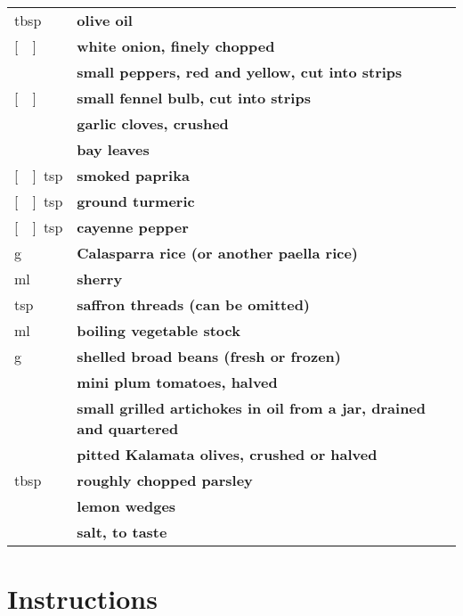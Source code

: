 \documentclass[main.tex]{subfiles}
\begin{document}
\vspace*{-\baselineskip}
\begin{table}[ht]
	\begin{tabularx}{\textwidth}{>{\hsize=0.333\hsize}X>{\bf\hsize=1\hsize}X}
	\unit[3]{tbsp} & olive oil\\
	\unit[\nicefrac{1}{2}]{} & white onion, finely chopped \\
	\unit[2]{} & small peppers, \unit[1]{} red and \unit[1]{} yellow, cut into strips\\
	\unit[\nicefrac{1}{2}]{} & small fennel bulb, cut into strips\\
	\unit[2]{} & garlic cloves, crushed\\
	\unit[2]{} & bay leaves \\
	\unit[\nicefrac{1}{4}]{tsp} & smoked paprika \\
	\unit[\nicefrac{1}{2}]{tsp} & ground turmeric \\
	\unit[\nicefrac{1}{4}]{tsp} & cayenne pepper \\
	\unit[150]{g} & Calasparra rice (or another paella rice) \\
	\unit[100]{ml} & sherry \\
	\unit[1]{tsp} & saffron threads (can be omitted) \\
	\unit[450]{ml} & boiling vegetable stock \\
	\unit[200]{g} & shelled broad beans (fresh or frozen) \\
	\unit[12]{} & mini plum tomatoes, halved \\
	\unit[5]{} & small grilled artichokes in oil from a jar, drained and quartered\\
	\unit[15]{} & pitted Kalamata olives, crushed or halved\\
	\unit[2]{tbsp} & roughly chopped parsley \\
	\unit[4]{} & lemon wedges \\
	& salt, to taste
	\end{tabularx}
\end{table}

\section{Instructions}
\end{document}

